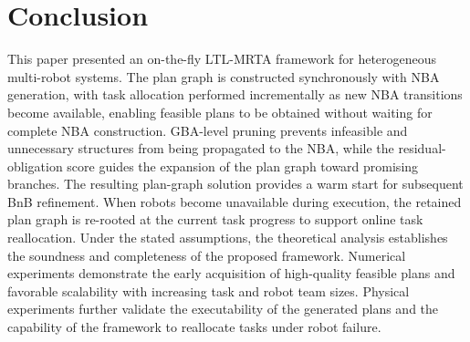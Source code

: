 \documentclass[lettersize,journal]{IEEEtran}
\theoremstyle{italiclemma}
\theoremstyle{italiclemma}
\theoremstyle{definition}
\begin{document}

\section{Conclusion}
\label{sec:conclusion}
This paper presented an on-the-fly LTL-MRTA framework for heterogeneous multi-robot systems. The plan graph is constructed synchronously with NBA generation, with task allocation performed incrementally as new NBA transitions become available, enabling feasible plans to be obtained
without waiting for complete NBA construction. GBA-level pruning prevents infeasible and unnecessary structures from being propagated to the NBA, while the residual-obligation score guides the expansion of the
plan graph toward promising branches. The resulting plan-graph solution provides a warm start for subsequent BnB refinement. When robots become unavailable during execution, the retained plan graph is re-rooted at
the current task progress to support online task reallocation. Under the stated assumptions, the theoretical analysis establishes the soundness
and completeness of the proposed framework.
Numerical experiments demonstrate the early acquisition of high-quality feasible plans and favorable scalability with increasing task and robot team sizes. Physical experiments further validate the executability of the generated plans and the capability of the framework to reallocate  tasks under robot failure.

\end{document}
